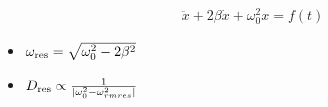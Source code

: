 

\vspace*{\fill}
\centering

\begin{align*}
    \ddot{x} + 2\beta \dot{x} + \omega_0^2 x = f(t) 
\end{align*}

\begin{itemize}
    \item $\omega_{\rm res} = \sqrt{\omega_0^2 - 2\beta^2}$
    \item $D_{\rm res} \propto \frac{1}{|\omega_0^2 - \omega_{rm res}^2|}$
\end{itemize}

\centering
\vspace*{\fill}

